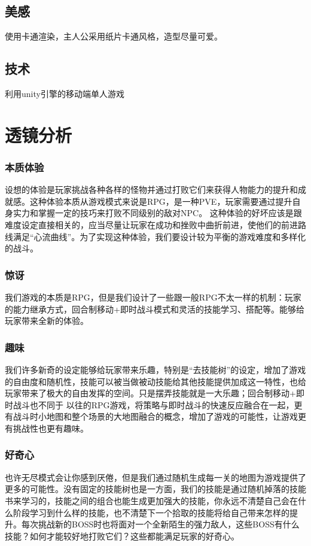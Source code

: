 \documentclass{article}
\begin{document}
\subsection{美感}
使用卡通渲染，主人公采用纸片卡通风格，造型尽量可爱。
\subsection{技术}
利用unity引擎的移动端单人游戏
\section{透镜分析}
\subsubsection{本质体验}
设想的体验是玩家挑战各种各样的怪物并通过打败它们来获得人物能力的提升和成就感。这种体验本质从游戏模式来说是RPG，是一种PVE，玩家需要通过提升自身实力和掌握一定的技巧来打败不同级别的敌对NPC。
这种体验的好坏应该是跟难度设定直接相关的，应当尽量让玩家在成功和挫败中曲折前进，使他们的前进路线满足“心流曲线”。为了实现这种体验，我们要设计较为平衡的游戏难度和多样化的战斗。
\subsubsection{惊讶}
我们游戏的本质是RPG，但是我们设计了一些跟一般RPG不太一样的机制：玩家的能力继承方式，回合制移动+即时战斗模式和灵活的技能学习、搭配等。能够给玩家带来全新的体验。
\subsubsection{趣味}
我们许多新奇的设定能够给玩家带来乐趣，特别是“去技能树”的设定，增加了游戏的自由度和随机性，技能可以被当做被动技能给其他技能提供加成这一特性，也给玩家带来了极大的自由发挥的空间。只是摆弄技能就是一大乐趣；回合制移动+即时战斗也不同于
以往的RPG游戏，将策略与即时战斗的快速反应融合在一起，更有战斗时小地图和整个场景的大地图融合的概念，增加了游戏的可能性，让游戏更有挑战性也更有趣味。
\subsubsection{好奇心}
也许无尽模式会让你感到厌倦，但是我们通过随机生成每一关的地图为游戏提供了更多的可能性。没有固定的技能树也是一方面，我们的技能是通过随机掉落的技能书来学习的，技能之间的组合也能生成更加强大的技能，你永远不清楚自己会在什么阶段学习到什么样的技能，也不清楚下一个拾取的技能将给自己带来怎样的提升。每次挑战新的BOSS时也将面对一个全新陌生的强力敌人，这些BOSS有什么技能？如何才能较好地打败它们？这些都能满足玩家的好奇心。
\end{document}
